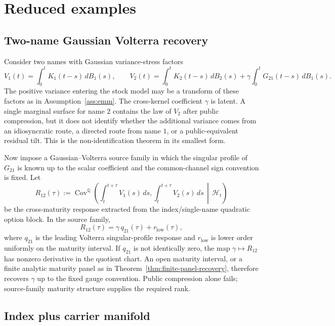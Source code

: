 \documentclass[11pt,a4paper]{amsart}
\theoremstyle{plain}
\theoremstyle{definition}
\theoremstyle{remark}
\DeclareMathOperator{\Cov}{Cov}
\newcommand{\QQ}{\mathbb{Q}}
\newcommand{\cH}{\mathcal{H}}
\newcommand{\dd}{\,d}
\begin{document}
\section{Reduced examples}\label{sec:examples}

\subsection{Two-name Gaussian Volterra recovery}

Consider two names with Gaussian variance-stress factors
\[
        V_1(t)=\int_0^t K_1(t-s)\dd B_1(s),\qquad
        V_2(t)=\int_0^t K_2(t-s)\dd B_2(s)+
        \gamma\int_0^t G_{21}(t-s)\dd B_1(s).
\]
The positive variance entering the stock model may be a transform of these factors as in
Assumption~\ref{ass:emm}.  The cross-kernel coefficient \(\gamma\) is latent.  A single
marginal surface for name \(2\)
contains the law of \(V_2\) after public compression, but it does not identify whether the
additional variance comes from an idiosyncratic route, a directed route from name \(1\), or a
public-equivalent residual tilt.  This is the non-identification theorem in its smallest form.

Now impose a Gaussian--Volterra source family in which the singular profile of \(G_{21}\) is known
up to the scalar coefficient and the common-channel sign convention is fixed.  Let
\[
        R_{12}(\tau)
        :=
        \Cov^\QQ\!\left(
        \int_t^{t+\tau}V_1(s)\dd s,
        \int_t^{t+\tau}V_2(s)\dd s
        \,\middle|\,\cH_t
        \right)
\]
be the cross-maturity response extracted from the index/single-name quadratic option block.  In
the source family,
\[
        R_{12}(\tau)
        =
        \gamma\,q_{21}(\tau)+r_{\mathrm{low}}(\tau),
\]
where \(q_{21}\) is the leading Volterra singular-profile response and
\(r_{\mathrm{low}}\) is lower order uniformly on the maturity interval.  If \(q_{21}\) is not
identically zero, the map \(\gamma\mapsto R_{12}\) has nonzero derivative in the quotient chart.
An open maturity interval, or a finite analytic maturity panel as in
Theorem~\ref{thm:finite-panel-recovery}, therefore recovers \(\gamma\) up to the fixed gauge
convention.  Public compression alone fails; source-family maturity structure supplies the
required rank.

\subsection{Index plus carrier manifold}
\end{document}
